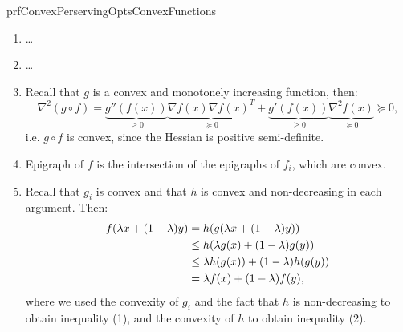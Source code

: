 \begin{prf}{prfConvexPerservingOptsConvexFunctions}
    \begin{enumerate}
        \item 
            \ldots
        \item 
            \ldots
        \item 
            Recall that $g$ is a convex and monotonely increasing function, then: 
            \begin{equation*}
                \nabla^2 (g \circ f) = \underbrace{g''(f(x))}_{\geq 0} \underbrace{\nabla f(x) \nabla {f(x)}^T }_{\succeq 0} + \underbrace{g'(f(x))}_{\geq 0} \underbrace{\nabla^2 f(x)}_{\succeq 0} \succeq 0,
            \end{equation*}
            i\@.e\@. $g \circ f$ is convex, since the Hessian is positive semi-definite.
        \item 
            Epigraph of $f$ is the intersection of the epigraphs of $f_i$, which are convex.
        \item
            Recall that $g_i$ is convex and that $h$ is convex and non-decreasing in each argument. Then:
            \begin{align}
                f(\lambda x + (1 - \lambda)y) 
                    &= h(g(\lambda x + (1 - \lambda)y)) \notag \\
                    &\leq h(\lambda g(x) + (1 - \lambda)g(y)) \\
                    &\leq \lambda h(g(x)) + (1 - \lambda)h(g(y)) \\
                    &= \lambda f(x) + (1 - \lambda)f(y), \notag
            \end{align}
            where we used the convexity of $g_i$ and the fact that $h$ is non-decreasing to obtain inequality (1), and the convexity of $h$ to obtain inequality (2). 
    \end{enumerate}
    \vspace*{-0.2cm}
\end{prf}



